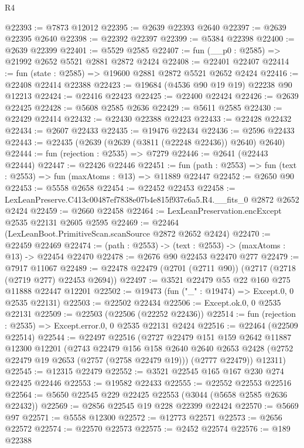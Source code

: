\begin{lexlean}{R4}
\begin{coremodule}
@22393 := @7873 @12012
@22395 := @2639 @22393 @2640
@22397 := @2639 @22395 @2640
@22398 := @22392 @22397
@22399 := @5384 @22398
@22400 := @2639 @22399
@22401 := @5529 @2585
@22407 := fun (__p0 : @2585) => @21992 @2652 @5521 @2881 @2872 @2424
@22408 := @22401 @22407
@22414 := fun (state : @2585) => @19600 @2881 @2872 @5521 @2652 @2424
@22416 := @22408 @22414 @22388
@22423 := @19684 (@4536 @90 @19 @19) @22238 @90 @12213
@22424 := @22416 @22423
@22425 := @22400 @22424
@22426 := @2639 @22425
@22428 := @5608 @2585 @2636
@22429 := @5611 @2585
@22430 := @22429 @22414
@22432 := @22430 @22388 @22423
@22433 := @22428 @22432
@22434 := @2607 @22433
@22435 := @19476 @22434
@22436 := @2596 @22433
@22443 := @22435 (@2639 (@2639 (@3811 (@22248 @22436)) @2640) @2640)
@22444 := fun (rejection : @2535) => @7279
@22446 := @2641 (@22443 @22444)
@22447 := @22426 @22446
@22451 := fun (path : @2553) => fun (text : @2553) => fun (maxAtoms : @13) => @11889 @22447
@22452 := @2650 @90
@22453 := @5558 @2658
@22454 := @22452 @22453
@22458 := LexLeanPreserve.C413c00487ef7838e07b4e815f937c6a5.R4.__fits_0 @2872 @2652 @2424
@22459 := @2660 @22458
@22464 := LexLeanPreservation.encExcept @2535 @22131 @2605 @2595
@22469 := @22464 (LexLeanBoot.PrimitiveScan.scanSource @2872 @2652 @2424)
@22470 := @22459 @22469
@22474 := (path : @2553) -> (text : @2553) -> (maxAtoms : @13) -> @22454 @22470
@22478 := @2676 @90 @22453 @22470 @277
@22479 := @7917 @11067
@22489 := @22478 @22479 (@2701 (@2711 @90)) (@2717 (@2718 (@2719 @277) @22453 @2694))
@22497 := @3521 @22479 @55 @22 @160 @275 @11888 @22447 @12201
@22502 := @19473 (fun ("_" : @19474) => Except.{0, 0} @2535 @22131)
@22503 := @22502 @22434
@22506 := Except.ok.{0, 0} @2535 @22131
@22509 := @22503 (@22506 (@22252 @22436))
@22514 := fun (rejection : @2535) => Except.error.{0, 0} @2535 @22131 @2424
@22516 := @22464 (@22509 @22514)
@22544 := @22497
    @22516
    (@2727
      @22479
      @151
      @159
      @2642
      @11887
      @12300
      @12201
      (@2743
        @22479
        @156
        @158
        @2640
        @2640
        @2653
        @2428
        (@2752 @22479 @19 @2653 (@2757 (@2758 @22479 @19)))
        (@2777 @22479))
      @12311)
@22545 := @12315 @22479
@22552 := @3521 @22545 @165 @167 @230 @274 @22425 @22446
@22553 := @19582 @22433
@22555 := @22552 @22553 @22516
@22564 := @5650 @22545 @229 @22425 @22553 (@3044 (@5658 @2585 @2636 @22432))
@22569 := @2856 @22545 @19 @228 @22399 @22424
@22570 := @5669 @97
@22571 := @5558 @12300
@22572 := @12773 @22571
@22573 := @2656 @22572
@22574 := @22570 @22573
@22575 := @2452 @22574
@22576 := @189 @22388

\end{coremodule}
\end{lexlean}
